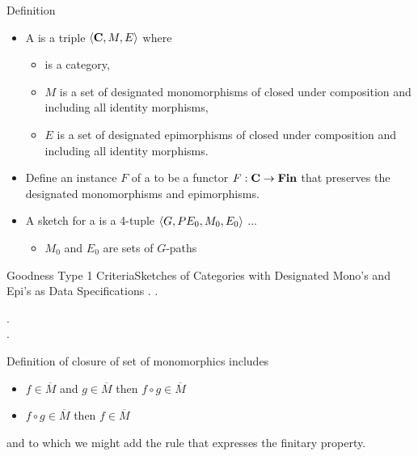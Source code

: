 
\renewcommand{\slidecontext}{Sketches of Categories with Designated Mono's and Epi's as Data Specifications}

\begin{frame}{Definition}
\begin{itemize}
\item A \term{\catMEterm} is a triple $\langle\textbf{C},M,E\rangle$ where 
\begin{itemize}
\item \catcw is a category,
\item $M$ is a set of designated monomorphisms of \catcw closed under composition and including all identity morphisms,
\item $E$ is a set of designated epimorphisms of \catcw closed under composition and including all identity morphisms.
\end{itemize}
\item Define an instance $F$ of a \catMEterm to be a functor $F: \textbf{C} \rightarrow \textbf{Fin}$ 
that preserves the designated monomorphisms and epimorphisms.


\item A sketch for a \catMEterm is a 4-tuple $\langle G,PE_0,M_0,E_0\rangle$ ...
\begin{itemize}
 \item   $M_0$ and $E_0$ are sets of $G$-paths  
\end{itemize}
\end{itemize}
\end{frame}

\begin{frame}{Goodness Type 1 Criteria}{\slidecontext}
\medskip
\goodnessoneA.
\medskip
\goodnessoneB.

\goodnessoneC. \\
\medskip
\goodnessoneD. \\
\medskip

Definition of closure of set of monomorphics includes
\begin{itemize}
\item $f \in \overline{M}$ and $g \in \overline{M}$ then $f \circ g \in \overline{M}$
\item $f \circ g \in \overline{M}$ then $f \in \overline{M}$
\end{itemize}
and to which we might add the rule that expresses the finitary property.
\end{frame}

